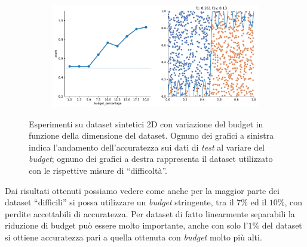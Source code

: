 \begin{figure}
\begin{subfigure}{.5\textwidth}
    \end{subfigure}%
    \hfill
    \begin{subfigure}{.5\textwidth}
        \centering
        \includegraphics[width=\textwidth]{img/2d_v2/15.pdf}
    \end{subfigure}
\caption{Esperimenti su dataset sintetici 2D con variazione del budget in funzione della dimensione del dataset. Ognuno dei grafici a sinistra indica l'andamento dell'accuratezza sui dati di \emph{test} al variare del \emph{budget}; ognuno dei grafici a destra rappresenta il dataset utilizzato con le rispettive misure di ``difficoltà''.}
\label{fig:2d_v2_2}
\end{figure}   

Dai risultati ottenuti possiamo vedere come anche per la maggior parte dei dataset ``difficili'' si possa utilizzare un \emph{budget} stringente, tra il $7\%$ ed il $10\%$, con perdite accettabili di accuratezza.
Per dataset di fatto linearmente separabili la riduzione di budget può essere molto importante, anche con solo l'$1\%$ del dataset si ottiene accuratezza pari a quella ottenuta con \emph{budget} molto più alti.



